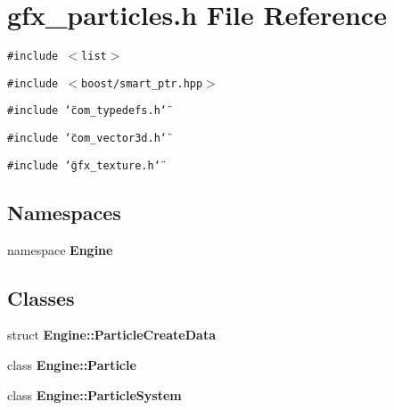 \section{gfx\_\-particles.h File Reference}
\label{gfx__particles_8h}
{\tt \#include $<$list$>$}\par
{\tt \#include $<$boost/smart\_\-ptr.hpp$>$}\par
{\tt \#include \char`\"{}com\_\-typedefs.h\char`\"{}}\par
{\tt \#include \char`\"{}com\_\-vector3d.h\char`\"{}}\par
{\tt \#include \char`\"{}gfx\_\-texture.h\char`\"{}}\par
\subsection*{Namespaces}
\begin{CompactItemize}
\item 
namespace {\bf Engine}
\end{CompactItemize}
\subsection*{Classes}
\begin{CompactItemize}
\item 
struct {\bf Engine::ParticleCreateData}
\item 
class {\bf Engine::Particle}
\item 
class {\bf Engine::ParticleSystem}
\end{CompactItemize}
